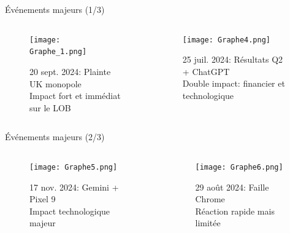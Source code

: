 \documentclass[aspectratio=169]{beamer}  %
\begin{document}
\begin{frame}{Événements majeurs (1/3)}
    \begin{columns}
        \begin{column}{0.48\textwidth}
            \begin{figure}
                \centering
                \texttt{[image: Graphe\_1.png]}
                \caption{20 sept. 2024: Plainte UK monopole\\
                Impact fort et immédiat sur le LOB}
            \end{figure}
        \end{column}
        \begin{column}{0.48\textwidth}
            \begin{figure}
                \centering
                \texttt{[image: Graphe4.png]}
                \caption{25 juil. 2024: Résultats Q2 + ChatGPT\\
                Double impact: financier et technologique}
            \end{figure}
        \end{column}
    \end{columns}
\end{frame}

\begin{frame}{Événements majeurs (2/3)}
    \begin{columns}
        \begin{column}{0.48\textwidth}
            \begin{figure}
                \centering
                \texttt{[image: Graphe5.png]}
                \caption{17 nov. 2024: Gemini + Pixel 9\\
                Impact technologique majeur}
            \end{figure}
        \end{column}
        \begin{column}{0.48\textwidth}
            \begin{figure}
                \centering
                \texttt{[image: Graphe6.png]}
                \caption{29 août 2024: Faille Chrome\\
                Réaction rapide mais limitée}
            \end{figure}
        \end{column}
    \end{columns}
\end{frame}
\end{document}

